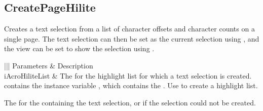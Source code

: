 \documentclass[letterpaper,12pt,english,openany,oneside]{sphinxmanual}
\begin{document}
\subsection{CreatePageHilite}
\label{\detokenize{IAC_API_OLE_Objects:createpagehilite}}
Creates a text selection from a list of character offsets and character counts on a single page. The text selection can then be set as the current selection using   , and the view can be set to show the selection using   .


\begin{sphinxVerbatim}[commandchars=\\\{\}]
  
\end{sphinxVerbatim}
\label{\detokenize{IAC_API_OLE_Objects:parameters-70}}


\begin{savenotes}\sphinxattablestart
\centering
{}\label{\detokenize{IAC_API_OLE_Objects:section-79}}\nobreak
\begin{tabular}[t]{|||}
\hline
\sphinxstyletheadfamily 
Parameters
&\sphinxstyletheadfamily 
Description
\\
\hline
iAcroHiliteList
&
The  for the highlight list for which a text selection is created.  contains the instance variable , which contains the .   Use   to create a highlight list.
\\
\hline
\end{tabular}
\par
\sphinxattableend\end{savenotes}


The  for the  containing the text selection, or  if the selection could not be created.
\end{document}
